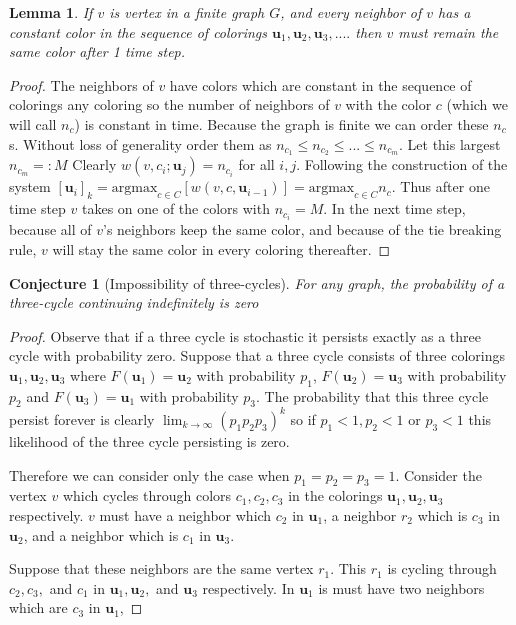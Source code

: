\documentclass[]{article}
\newtheorem{conjecture}[theorem]{Conjecture}
\newtheorem{lemma}[theorem]{Lemma}
\newcommand{\uu}{\mathbf{u}}
\begin{document}
\begin{lemma}
	If $v$ is vertex in a finite graph $G$, and every neighbor of $v$ has a constant color in the sequence of colorings $\uu_1,\uu_2,\uu_3,....$ then $v$ must remain the same color after 1 time step. 
\end{lemma}
\begin{proof}
	The neighbors of $v$ have colors which are constant in the sequence of colorings any coloring so the number of neighbors of $v$ with the color $c$ (which we will call $n_c$) is constant in time. Because the graph is finite we can order these $n_c$s. Without loss of generality order them as $n_{c_1}\leq n_{c_2}\leq...\leq n_{c_m}$. Let this largest $n_{c_m}=:M$ Clearly $w(v,c_i;\uu_j)=n_{c_i}$ for all $i,j$. Following the construction of the system $[\uu_i]_k=\text{argmax}_{c\in C}[w(v,c,\uu_{i-1})]= \text{argmax}_{c\in C} n_{c}$. Thus after one time step $v$ takes on one of the colors with $n_{c_i}=M$. In the next time step, because all of $v$'s neighbors keep the same color, and because of the tie breaking rule, $v$ will stay the same color in every coloring thereafter. 
\end{proof}

\begin{conjecture}[Impossibility of three-cycles]
	For any graph, the probability of a three-cycle continuing indefinitely is zero
\end{conjecture}

\begin{proof}
	Observe that if a three cycle is stochastic it persists exactly as a three cycle with probability zero. Suppose that a three cycle consists of three colorings $\uu_1,\uu_2,\uu_3$ where $F(\uu_1)=\uu_2$ with probability $p_1$, $F(\uu_2)=\uu_3$ with probability $p_2$ and $F(\uu_3)=\uu_1$ with probability $p_3$. The probability that this three cycle persist forever is clearly $\lim_{k\rightarrow \infty} (p_1p_2p_3)^k$ so if $p_1<1, p_2<1$ or $p_3<1$ this likelihood of the three cycle persisting is zero. 
	
	Therefore we can consider only the case when $p_1=p_2=p_3=1$. Consider the vertex $v$ which cycles through colors $c_1, c_2, c_3$ in the colorings $\uu_1,\uu_2, \uu_3$ respectively. $v$ must have a neighbor which $c_2$ in $\uu_1$, a neighbor $r_2$ which is $c_3$ in $\uu_2$, and a neighbor which is $c_1$ in $\uu_3$. 
	
	 Suppose that these neighbors are the same vertex $r_1$. This $r_1$ is cycling through $c_2,c_3,$ and $c_1$ in $\uu_1,\uu_2,$ and $\uu_3$ respectively. In $\uu_1$ is must have two neighbors which are $c_3$ in $\uu_1$, 

\end{proof}
\end{document}
